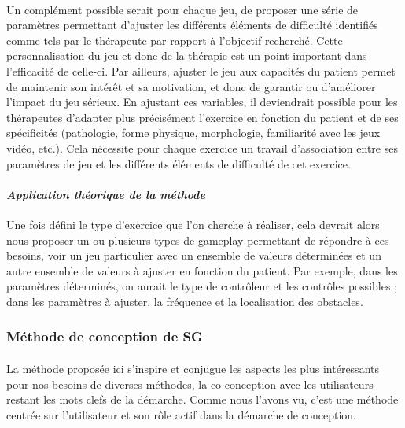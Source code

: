 \paragraph{}Un complément possible serait pour chaque jeu, de proposer une série de paramètres permettant d’ajuster les différents éléments de difficulté identifiés comme tels par le thérapeute par rapport à l’objectif recherché. Cette personnalisation du jeu et donc de la thérapie est un point important dans l’efficacité de celle-ci. Par ailleurs, ajuster le jeu aux capacités du patient permet de maintenir son intérêt et sa motivation, et donc de garantir ou d’améliorer l’impact du jeu sérieux. En ajustant ces variables, il deviendrait possible pour les thérapeutes d’adapter plus précisément l’exercice en fonction du patient et de ses spécificités (pathologie, forme physique, morphologie, familiarité avec les jeux vidéo, etc.). Cela nécessite pour chaque exercice un travail d’association entre ses paramètres de jeu et les différents éléments de difficulté de cet exercice.

	\paragraph{\emph{Application théorique de la méthode}\\}
Une fois défini le type d'exercice que l’on cherche à réaliser, cela devrait alors nous proposer un ou plusieurs types de gameplay permettant de répondre à ces besoins, voir un jeu particulier avec un ensemble de valeurs déterminées et un autre ensemble de valeurs à ajuster en fonction du patient. Par exemple, dans les paramètres déterminés, on aurait le type de contrôleur et les contrôles possibles ; dans les paramètres à ajuster, la fréquence et la localisation des obstacles.

	\subsubsection*{Méthode de conception de SG}
\paragraph{} La méthode proposée ici s'inspire et conjugue les aspects les plus intéressants pour nos besoins de diverses  méthodes, la co-conception avec les utilisateurs restant les mots clefs de la démarche. Comme nous l'avons vu, c'est une méthode centrée sur l'utilisateur et son rôle actif dans la démarche de conception.

